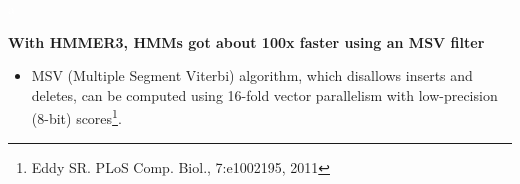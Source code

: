 \documentclass[landscape]{slides}
\begin{document}
\begin{slide}
\textcolor{white}{a}
\medskip
\medskip
\medskip
\medskip
\medskip
{}
\vfill
\end{slide}
\begin{slide}
\begin{center}
  \textbf{With HMMER3, HMMs got about 100x faster using an MSV filter}
\end{center}

\medskip

\begin{itemize}

\small
\item MSV (Multiple Segment Viterbi) algorithm, which disallows inserts
  and deletes, can be computed using 16-fold vector parallelism with
  low-precision (8-bit) scores\footnote{Eddy SR. PLoS Comp. Biol., 7:e1002195, 2011}.

\end{itemize}


\vfill 
\end{slide}
\end{document}
